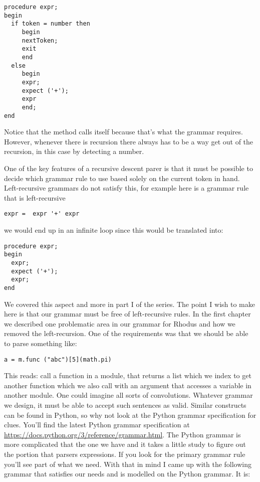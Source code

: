 \begin{lstlisting}
procedure expr;
begin
  if token = number then
     begin
     nextToken;
     exit
     end
  else
     begin
     expr;
     expect ('+');
     expr
     end;
end
\end{lstlisting}

Notice that the method calls itself because that's what the grammar requires. However, whenever there is recursion there always has to be a way get out of the recursion, in this case by detecting a number.

One of the key features of a recursive descent parer is that it must be possible to decide which grammar rule to use based solely on the current token in hand. Left-recursive grammars do not satisfy this, for example here is a grammar rule that is left-recursive

\begin{lstlisting}
expr =  expr '+' expr
\end{lstlisting}

we would end up in an infinite loop since this would be translated into:

\begin{lstlisting}
procedure expr;
begin
  expr;
  expect ('+');
  expr;
end
\end{lstlisting}

We covered this aspect and more in part I of the series. The point I wish to make here is that our grammar must be free of left-recursive rules. In the first chapter we described one problematic area in our grammar for Rhodus and how we removed the left-recursion. One of the requirements was that we should be able to parse something like:

\begin{lstlisting}
a = m.func ("abc")[5](math.pi)
\end{lstlisting}

This reads: call a function in a module, that returns a list which we index to get another function which we also call with an argument that accesses a variable in another module. One could imagine all sorts of convolutions. Whatever grammar we design, it must be able to accept such sentences as valid. Similar constructs can be found in Python, so why not look at the Python grammar specification for clues.  You'll find the latest Python grammar specification at \url{https://docs.python.org/3/reference/grammar.html}. The Python grammar is more complicated that the one we have and it takes a little study to figure out the portion that parsers expressions. If you look for the primary grammar rule you'll see part of what we need. With that in mind I came up with the following grammar that satisfies our needs and is modelled on the Python grammar. It is:

